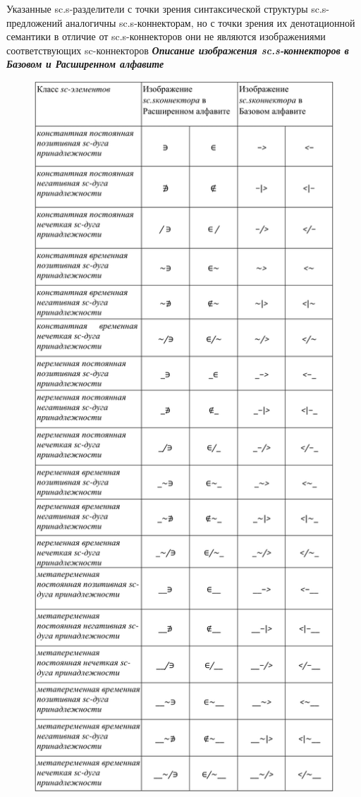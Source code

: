 Указанные sc.s-разделители с точки зрения синтаксической структуры sc.s-предложений аналогичны sc.s-коннекторам, но с точки зрения их денотационной семантики в отличие от sc.s-коннекторов они не являются изображениями соответствующих sc-коннекторов
\newpage
\textbf{\textit{Описание изображения sc.s-коннекторов в Базовом и Расширенном алфавите}}

\begin{figure}[h]
	\centering
	\includegraphics[scale=0.3]{images/intro/scs_membership_connectors_0.png}
\end{figure}

